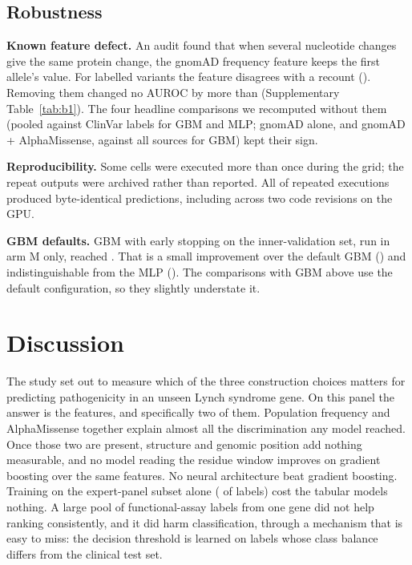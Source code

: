 \documentclass[11pt]{article}
\newcommand{\gene}[1]{\textit{#1}}
\begin{document}
\begin{table}[t]
\centering
\caption{\textbf{Discrimination without the absent-from-gnomAD shortcut.} AUROC [95\% CI],
mean over \gene{MLH1}, \gene{MSH2}, \gene{MSH6}.}
\label{tab:observed}
\resizebox{0.85\textwidth}{!}{}
\end{table}

\subsection{Robustness}

\textbf{Known feature defect.} An audit found that when several nucleotide changes give
the same protein change, the gnomAD frequency feature keeps the first allele's value.
For \nBOne{} labelled variants the feature disagrees with a recount (\nBOneGenes). Removing them changed no
AUROC by more than \bOneMaxChange{} (Supplementary Table~\ref{tab:b1}). The four headline
comparisons we recomputed without them (pooled against ClinVar labels for GBM and MLP;
gnomAD alone, and gnomAD + AlphaMissense, against all sources for GBM) kept their sign.

\textbf{Reproducibility.} Some cells were executed more than once during the grid; the
repeat outputs were archived rather than reported. All \nRepeatIdentical{} of
\nRepeatRuns{} repeated executions produced byte-identical predictions, including across
two code revisions on the GPU.

\textbf{GBM defaults.} GBM with early stopping on the inner-validation set, run in arm M
only, reached \aucMGbmEs. That is a small improvement over the default GBM
(\dAucGbmEsVsGbm) and indistinguishable from the MLP (\dAucGbmEsVsMlp). The comparisons
with GBM above use the default configuration, so they slightly understate it.

\section{Discussion}

The study set out to measure which of the three construction choices matters for
predicting pathogenicity in an unseen Lynch syndrome gene. On this panel the answer is
the features, and specifically two of them. Population frequency and AlphaMissense
together explain almost all the discrimination any model reached. Once those two are
present, structure and genomic position add nothing measurable, and no model reading the
residue window improves on gradient boosting over the same features. No
neural architecture beat gradient boosting. Training on the expert-panel subset alone
(\nExpert{} of \nLabelled{} labels) cost the tabular models nothing. A large pool of functional-assay labels from one gene did not help
ranking consistently, and it did harm classification, through a mechanism that is easy to
miss: the decision threshold is learned on labels whose class balance differs from the
clinical test set.
\end{document}
